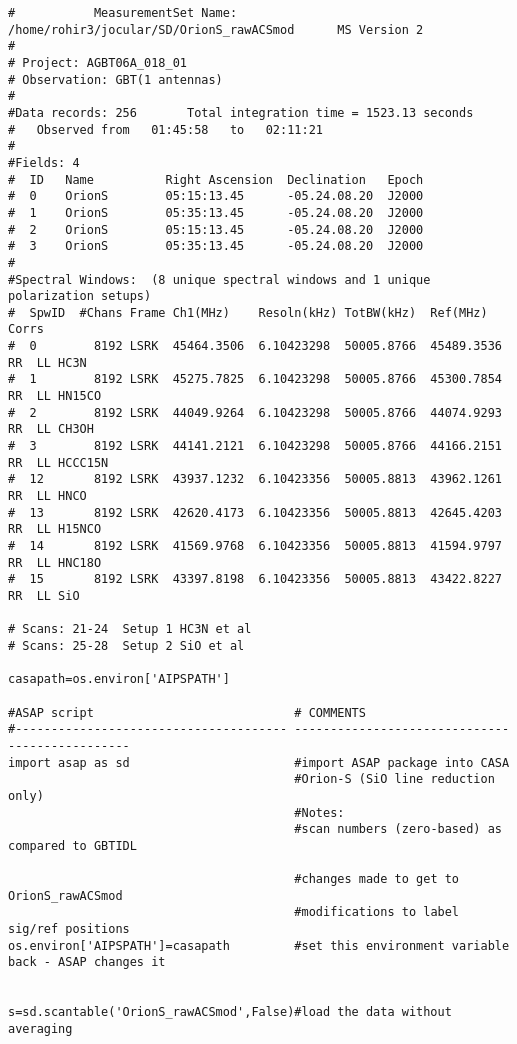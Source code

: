 \small
\begin{verbatim}
#           MeasurementSet Name:  /home/rohir3/jocular/SD/OrionS_rawACSmod      MS Version 2
#
# Project: AGBT06A_018_01
# Observation: GBT(1 antennas)
#
#Data records: 256       Total integration time = 1523.13 seconds
#   Observed from   01:45:58   to   02:11:21
#
#Fields: 4
#  ID   Name          Right Ascension  Declination   Epoch
#  0    OrionS        05:15:13.45      -05.24.08.20  J2000
#  1    OrionS        05:35:13.45      -05.24.08.20  J2000
#  2    OrionS        05:15:13.45      -05.24.08.20  J2000
#  3    OrionS        05:35:13.45      -05.24.08.20  J2000
#
#Spectral Windows:  (8 unique spectral windows and 1 unique polarization setups)
#  SpwID  #Chans Frame Ch1(MHz)    Resoln(kHz) TotBW(kHz)  Ref(MHz)    Corrs
#  0        8192 LSRK  45464.3506  6.10423298  50005.8766  45489.3536  RR  LL HC3N
#  1        8192 LSRK  45275.7825  6.10423298  50005.8766  45300.7854  RR  LL HN15CO
#  2        8192 LSRK  44049.9264  6.10423298  50005.8766  44074.9293  RR  LL CH3OH
#  3        8192 LSRK  44141.2121  6.10423298  50005.8766  44166.2151  RR  LL HCCC15N
#  12       8192 LSRK  43937.1232  6.10423356  50005.8813  43962.1261  RR  LL HNCO
#  13       8192 LSRK  42620.4173  6.10423356  50005.8813  42645.4203  RR  LL H15NCO
#  14       8192 LSRK  41569.9768  6.10423356  50005.8813  41594.9797  RR  LL HNC18O
#  15       8192 LSRK  43397.8198  6.10423356  50005.8813  43422.8227  RR  LL SiO

# Scans: 21-24  Setup 1 HC3N et al
# Scans: 25-28  Setup 2 SiO et al

casapath=os.environ['AIPSPATH']

#ASAP script                            # COMMENTS                                      
#-------------------------------------- ----------------------------------------------- 
import asap as sd                       #import ASAP package into CASA                  
                                        #Orion-S (SiO line reduction only)
                                        #Notes:
                                        #scan numbers (zero-based) as compared to GBTIDL

                                        #changes made to get to OrionS_rawACSmod
                                        #modifications to label sig/ref positions
os.environ['AIPSPATH']=casapath         #set this environment variable back - ASAP changes it


s=sd.scantable('OrionS_rawACSmod',False)#load the data without averaging                
\end{verbatim}
\normalsize

